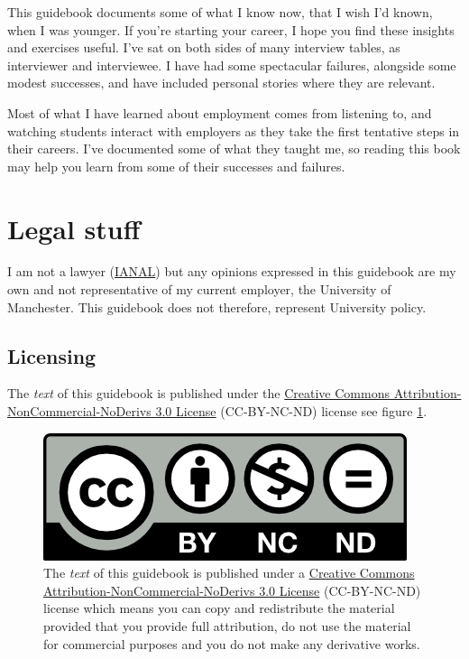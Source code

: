 \documentclass[
]{book}
\begin{document}
This guidebook documents some of what I know now, that I wish I'd known, when I was younger. If you're starting your career, I hope you find these insights and exercises useful. I've sat on both sides of many interview tables, as interviewer and interviewee. I have had some spectacular failures, alongside some modest successes, and have included personal stories where they are relevant.

Most of what I have learned about employment comes from listening to, and watching students interact with employers as they take the first tentative steps in their careers. I've documented some of what they taught me, so reading this book may help you learn from some of their successes and failures.

\hypertarget{legal}{%
\section{Legal stuff}\label{legal}}

I am not a lawyer (\href{https://en.wikipedia.org/wiki/IANAL}{IANAL}) but any opinions expressed in this guidebook are my own and not representative of my current employer, the University of Manchester. This guidebook does not therefore, represent University policy.

\hypertarget{license}{%
\subsection{Licensing}\label{license}}

The \emph{text} of this guidebook is published under the \href{https://creativecommons.org/licenses/by-nc-nd/3.0/}{Creative Commons Attribution-NonCommercial-NoDerivs 3.0 License} (CC-BY-NC-ND) license see figure \ref{fig:cc-by-nc-nd-fig}.

\begin{figure}

{\centering \includegraphics[width=1\linewidth]{images/by-nc-nd} 

}

\caption{The \emph{text} of this guidebook is published under a \href{https://creativecommons.org/licenses/by-nc-nd/3.0/}{Creative Commons Attribution-NonCommercial-NoDerivs 3.0 License} (CC-BY-NC-ND) license which means you can copy and redistribute the material provided that you provide full attribution, do not use the material for commercial purposes and you do not make any derivative works.}\label{fig:cc-by-nc-nd-fig}
\end{figure}
\end{document}
